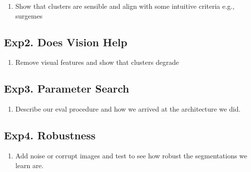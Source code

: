 \begin{enumerate}
\item Show that clusters are sensible and align with some intuitive criteria e.g., surgemes
\end{enumerate}

\subsection{Exp2. Does Vision Help}

\begin{enumerate}
\item Remove visual features and show that clusters degrade
\end{enumerate}

\subsection{Exp3. Parameter Search}

\begin{enumerate}
\item Describe our eval procedure and how we arrived at the architecture we did.
\end{enumerate}

\subsection{Exp4. Robustness}
\begin{enumerate}
\item Add noise or corrupt images and test to see how robust the segmentations we learn are.
\end{enumerate}


